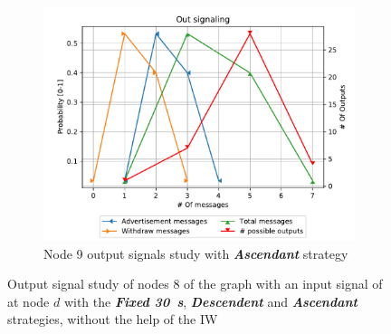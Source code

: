 \begin{figure}[ht]
\begin{subfigure}[b]{0.32\textwidth}
         \label{fig:signal_node9_fabrikant_descendent_noiw}
     \end{subfigure}
     \hfill
     \begin{subfigure}[b]{0.32\textwidth}
         \centering
         \includegraphics[width=\textwidth]{images/signal_study/fabrikant/Ascending.pdf}
		 \caption{Node \num{9} output signals study with \textbf{\textit{Ascendant}} strategy}
         \label{fig:signal_node9_fabrikant_ascendant_noIW}
     \end{subfigure}
		\caption{Output signal study of nodes \num{8} of the graph
			 with an input signal of  at node $d$
			with the \textbf{\textit{Fixed \SI{30}{\second}}}, \textbf{\textit{Descendent}}
			and \textbf{\textit{Ascendant}}	strategies, without the help of the \ac{IW}}
        \label{fig:signal_fabrikant}
\end{figure}

